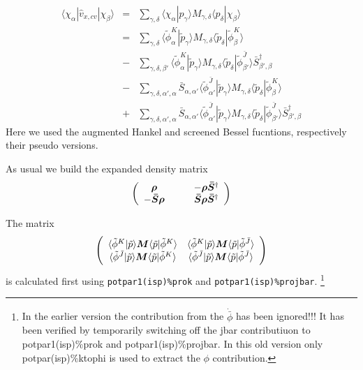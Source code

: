 \documentclass[11pt,a4paper]{report}
\begin{document}
\begin{eqnarray}
\langle\chi_\alpha|\hat{v}_{x,cv}|\chi_\beta\rangle
&=&
\sum_{\gamma,\delta}
\langle\chi_\alpha|p_\gamma\rangle 
M_{\gamma,\delta}\langle p_\delta|\chi_\beta\rangle
\nonumber\\
&=&
\sum_{\gamma,\delta}
\langle\tilde{\phi}^{K}_\alpha|\tilde{p}_\gamma\rangle 
M_{\gamma,\delta}
\langle\tilde{p}_\delta|\tilde{\phi}^{K}_\beta\rangle
\nonumber\\
&-&
\sum_{\gamma,\delta,\beta'}
\langle\tilde{\phi}^{K}_\alpha|\tilde{p}_\gamma\rangle 
M_{\gamma,\delta}
\langle\tilde{p}_\delta|\tilde{\phi}^{\bar{J}}_{\beta'}\rangle 
\bar{S}^\dagger_{\beta',\beta}
\nonumber\\
&-&
\sum_{\gamma,\delta,\alpha',\alpha}
\bar{S}_{\alpha,\alpha'}
\langle\tilde{\phi}^{\bar{J}}_{\alpha'}|\tilde{p}_\gamma\rangle 
M_{\gamma,\delta}
\langle\tilde{p}_\delta|\tilde{\phi}^{K}_{\beta}\rangle 
\nonumber\\
&+&
\sum_{\gamma,\delta,\alpha',\alpha}
\bar{S}_{\alpha,\alpha'}
\langle\tilde{\phi}^{\bar{J}}_{\alpha'}|\tilde{p}_\gamma\rangle 
M_{\gamma,\delta}
\langle\tilde{p}_\delta|\tilde{\phi}^{\bar{J}}_{\beta'}\rangle 
\bar{S}^\dagger_{\beta',\beta}
\end{eqnarray}
Here we used the augmented Hankel and screened Bessel fucntions,
respectively their pseudo versions.

As usual we build the expanded density matrix
\begin{eqnarray}
\left(\begin{array}{cc}
  \bm{\rho} \qquad& 
-\bm{\rho}\bm{\bar{S}}^\dagger\\
-\bm{\bar{S}}\bm{\rho} \qquad& 
\bm{\bar{S}}\bm{\rho}\bm{\bar{S}}^\dagger\\
\end{array}\right)
\end{eqnarray}

The matrix 
\begin{eqnarray}
\left(\begin{array}{cc}
\langle\tilde{\phi}^{K}|\tilde{p}\rangle 
\bm{M}\langle\tilde{p}|\tilde{\phi}^{K}\rangle &
\langle\tilde{\phi}^{K}|\tilde{p}\rangle 
\bm{M}\langle\tilde{p}|\tilde{\phi}^{\bar{J}}\rangle \\
\langle\tilde{\phi}^{\bar{J}}|\tilde{p}\rangle 
\bm{M}\langle\tilde{p}|\tilde{\phi}^{K}\rangle &
\langle\tilde{\phi}^{\bar{J}}|\tilde{p}\rangle 
\bm{M}\langle\tilde{p}|\tilde{\phi}^{\bar{J}}\rangle \\
\end{array}\right)
\end{eqnarray}
is calculated first using \verb|potpar1(isp)%prok| and
\verb|potpar1(isp)%projbar|.
\footnote{ In the earlier version the contribution from the
  $\dot{\bar{\phi}}$ has been ignored!!! It has been verified by
  temporarily switching off the jbar contributiuon to
  potpar1(isp)\%prok and potpar1(isp)\%projbar. In this old version
  only potpar(isp)\%ktophi is used to extract the $\phi$
  contribution.}
\end{document}
